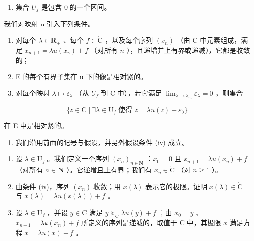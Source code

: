 \begin{enumerate}
\def\labelenumi{\alph{enumi})}
\setcounter{enumi}{1}
\tightlist
\item
  集合 \(U_{f}\) 是包含 0 的一个区间。
\end{enumerate}

我们对映射 u 引入下列条件。

\begin{enumerate}
\def\labelenumi{(\roman{enumi})}
\setcounter{enumi}{3}
\item
  对每个 \(\lambda \in \mathbf{R}_{+}\) 、每个 \(f \in \mathring{\mathrm{C}}\) ，以及每个序列 \((x_{n})\) （由 C 中元素组成，满足 \(x_{n+1} = \lambda u(x_{n}) + f\) （对所有 \(n\) ），且递增并上有界或递减），它都是收敛的；
\item
  E 的每个有界子集在 u 下的像是相对紧的。
\item
  对每个映射 \(\lambda \mapsto \varepsilon_{\lambda}\) （从 \(U_f\) 到 C 中），若它满足 \(\lim_{\lambda \to \lambda_m} \varepsilon_{\lambda} = 0\) ，则集合
\end{enumerate}

\[
\{z \in \mathrm{C} \mid \exists \lambda \in \mathrm{U}_{f}\text{ 使得 } z = \lambda u(z) + \varepsilon_{\lambda} \}
\]

在 E 中是相对紧的。

\begin{enumerate}
\def\labelenumi{\arabic{enumi})}
\setcounter{enumi}{25}
\tightlist
\item
  我们沿用前面的记号与假设，并另外假设条件 (iv) 成立。
\end{enumerate}

\begin{enumerate}
\def\labelenumi{\alph{enumi})}
\item
  设 \(\lambda \in \mathrm{U}_f\) 。我们定义一个序列 \((x_n)_{n \in \mathbf{N}}\) ：\(x_0 = 0\) 且 \(x_{n+1} = \lambda u(x_n) + f\) （对所有 \(n \in \mathbf{N}\) ）。它递增且上有界；我们有 \(x_n \in \mathring{\mathrm{C}}\) （对 \(n \geqslant 1\) ）。
\item
  由条件 (iv)，序列 \((x_{n})\) 收敛；用 \(x(\lambda)\) 表示它的极限。证明 \(x(\lambda) \in \mathring{\mathrm{C}}\) 与 \(x(\lambda) = \lambda u(x(\lambda)) + f\) 。
\item
  设 \(\lambda \in \mathrm{U}_f\) ，并设 \(y \in \mathrm{C}\) 满足 \(y \succcurlyeq_{\mathrm{C}} \lambda u(y) + f\) ；由 \(x_0 = y\) 、\(x_{n+1} = \lambda u(x_n) + f\) 所定义的序列是递减的，取值于 C 中，其极限 \(x\) 满足方程 \(x = \lambda u(x) + f\) 。
\end{enumerate}

